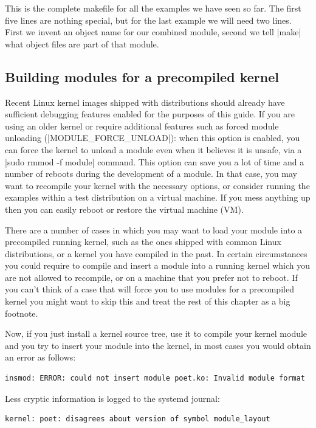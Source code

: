 \documentclass[10pt, oneside]{book}
\begin{document}
This is the complete makefile for all the examples we have seen so far.
The first five lines are nothing special, but for the last example we will need two lines.
First we invent an object name for our combined module, second we tell \sh|make| what object files are part of that module.

\subsection{Building modules for a precompiled kernel}
\label{sec:precompiled}
Recent Linux kernel images shipped with distributions should already have sufficient debugging features enabled for the purposes of this guide.
If you are using an older kernel or require additional features such as forced module unloading (\cpp|MODULE_FORCE_UNLOAD|): when this option is enabled,
you can force the kernel to unload a module even when it believes it is unsafe, via a \sh|sudo rmmod -f module| command.
This option can save you a lot of time and a number of reboots during the development of a module.
In that case, you may want to recompile your kernel with the necessary options, or consider running the examples within a test distribution on a virtual machine.
If you mess anything up then you can easily reboot or restore the virtual machine (VM).

There are a number of cases in which you may want to load your module into a precompiled running kernel,
such as the ones shipped with common Linux distributions, or a kernel you have compiled in the past.
In certain circumstances you could require to compile and insert a module into a running kernel which you are not allowed to recompile,
or on a machine that you prefer not to reboot.
If you can't think of a case that will force you to use modules for a precompiled kernel you might want to skip this and treat the rest of this chapter as a big footnote.

Now, if you just install a kernel source tree, use it to compile your kernel module and you try to insert your module into the kernel,
in most cases you would obtain an error as follows:

\begin{verbatim}
insmod: ERROR: could not insert module poet.ko: Invalid module format
\end{verbatim}

Less cryptic information is logged to the systemd journal:

\begin{verbatim}
kernel: poet: disagrees about version of symbol module_layout
\end{verbatim}
\end{document}
